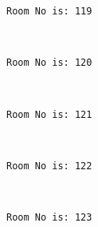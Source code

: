 \documentclass[11pt]{article}
\begin{document}
    \begin{Verbatim}[commandchars=\\\{\}]
Room No is: 119

    \end{Verbatim}

    \begin{center}
    \end{center}
    { \hspace*{\fill} \\}
    
    \begin{Verbatim}[commandchars=\\\{\}]
Room No is: 120

    \end{Verbatim}

    \begin{center}
    \end{center}
    { \hspace*{\fill} \\}
    
    \begin{Verbatim}[commandchars=\\\{\}]
Room No is: 121

    \end{Verbatim}

    \begin{center}
    \end{center}
    { \hspace*{\fill} \\}
    
    \begin{Verbatim}[commandchars=\\\{\}]
Room No is: 122

    \end{Verbatim}

    \begin{center}
    \end{center}
    { \hspace*{\fill} \\}
    
    \begin{Verbatim}[commandchars=\\\{\}]
Room No is: 123

    \end{Verbatim}
\end{document}
